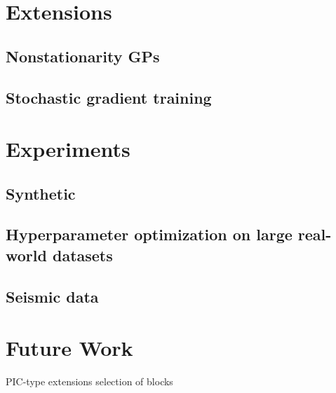 \documentclass{article}
\begin{document}

\section{Extensions}


\subsection{Nonstationarity GPs}

\subsection{Stochastic gradient training}

\section{Experiments}

\subsection{Synthetic}

\subsection{Hyperparameter optimization on large real-world datasets}

\subsection{Seismic data}

\section{Future Work}

PIC-type extensions
selection of blocks

%



\end{document}
